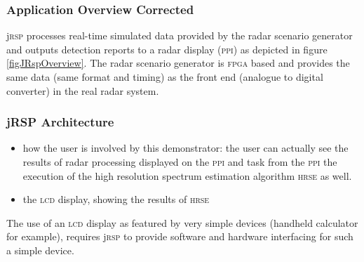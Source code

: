 \documentclass{sig-alternate}
\newcommand{\acronym}[1]{\textsc{#1}}
\begin{document}
\subsubsection{Application Overview Corrected}
j\acronym{rsp} processes real-time simulated data provided by the radar scenario generator and
outputs detection reports to a radar display (\acronym{ppi}) 
as depicted in figure \ref{figJRspOverview}. 
The radar scenario generator is \acronym{fpga} based 
and provides the same data (same format and timing) 
as the front end (analogue to digital converter) in the real radar system.

\subsubsection{jRSP Architecture}


\begin{itemize}
\item how the user
is involved by this demonstrator: the user can actually see the results of radar processing
displayed on the \acronym{ppi} and task from the \acronym{ppi} the execution of the high resolution
spectrum estimation algorithm \acronym{hrse} as well.
\item the \acronym{lcd} display, showing the results of \acronym{hrse}
\end{itemize}

The use of an \acronym{lcd} display as featured by very simple devices 
(handheld calculator for example), 
requires j\acronym{rsp} to provide software and hardware interfacing for such a simple device. 
\end{document}
